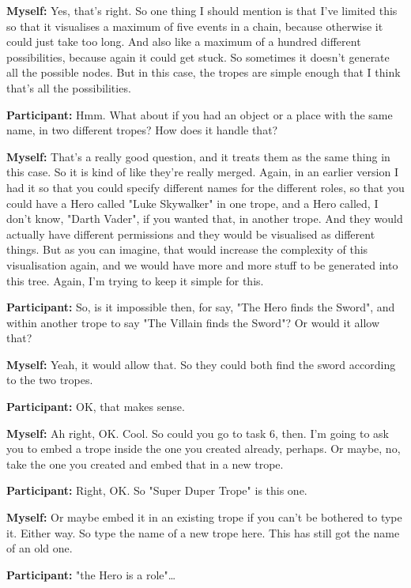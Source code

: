 \documentclass[11pt]{report}
\newcommand{\llabel}[1]{\hypertarget{llineno:#1}{\linelabel{#1}}}
\begin{document}
\begin{linenumbers}
\textbf{Myself:} Yes, that's right. So one thing I should mention is that I've limited this so that it visualises a maximum of five events in a chain, because otherwise it could just take too long. And also like a maximum of a hundred different possibilities, because again it could get stuck. So sometimes it doesn't generate all the possible nodes. But in this case, the tropes are simple enough that I think that's all the possibilities.

\textbf{Participant:} Hmm. What about if you had an object or a place with the
same name, in two different tropes? How does it handle that?\llabel{lne:feature1d}

\textbf{Myself:} That's a really good question, and it treats them as the same thing in this case. So it is kind of like they're really merged. Again, in an earlier version I had it so that you could specify different names for the different roles, so that you could have a Hero called "Luke Skywalker" in one trope, and a Hero called, I don't know, "Darth Vader", if you wanted that, in another trope. And they would actually have different permissions and they would be visualised as different things. But as you can imagine, that would increase the complexity of this visualisation again, and we would have more and more stuff to be generated into this tree. Again, I'm trying to keep it simple for this.

\textbf{Participant:} So, is it impossible then, for say, "The Hero finds the Sword", and within another trope to say "The Villain finds the Sword"? Or would it allow that?

\textbf{Myself:} Yeah, it would allow that. So they could both find the sword according to the two tropes.

\textbf{Participant:} OK, that makes sense.

\textbf{Myself:} Ah right, OK. Cool. So could you go to task 6, then. I'm going to ask you to embed a trope inside the one you created already, perhaps. Or maybe, no, take the one you created and embed that in a new trope.

\textbf{Participant:} Right, OK. So "Super Duper Trope" is this one.

\textbf{Myself:} Or maybe embed it in an existing trope if you can't be bothered to type it. Either way. So type the name of a new trope here. This has still got the name of an old one.

\textbf{Participant:} "the Hero is a role"\ldots{}


\end{linenumbers}
\end{document}
